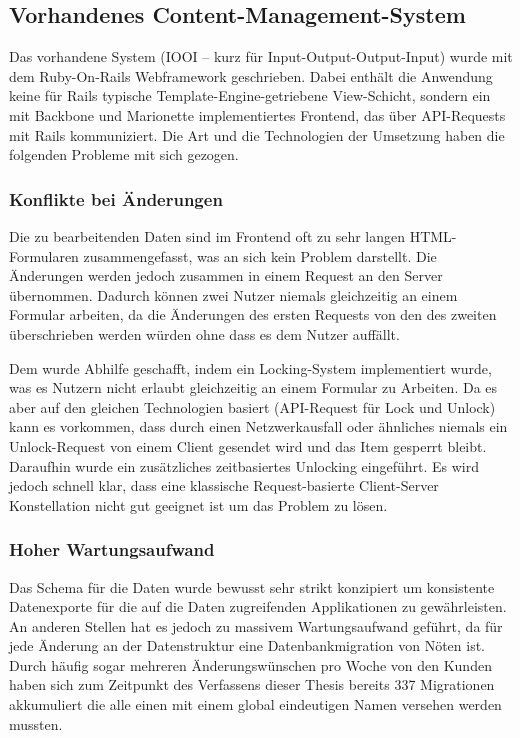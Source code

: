 \subsection{Vorhandenes Content-Management-System}
\label{ssec:ep-vorhandenes-content-management-system}

Das vorhandene System (IOOI -- kurz für Input-Output-Output-Input) wurde mit
dem Ruby-On-Rails Webframework geschrieben.  Dabei enthält die Anwendung keine
für Rails typische Template-Engine-getriebene View-Schicht, sondern ein mit
Backbone und Marionette \cite{marionette} implementiertes Frontend, das über
API-Requests mit Rails kommuniziert.  Die Art und die Technologien der Umsetzung
haben die folgenden Probleme mit sich gezogen.

\subsubsection{Konflikte bei Änderungen}
\label{sssec:epv-konflikte-bei-aenderungen}

Die zu bearbeitenden Daten sind im Frontend oft zu sehr langen HTML-Formularen
zusammengefasst, was an sich kein Problem darstellt.  Die Änderungen werden
jedoch zusammen in einem Request an den Server übernommen.  Dadurch können
zwei Nutzer niemals gleichzeitig an einem Formular arbeiten, da die Änderungen
des ersten Requests von den des zweiten überschrieben werden würden ohne dass
es dem Nutzer auffällt.

Dem wurde Abhilfe geschafft, indem ein Locking-System implementiert wurde, was
es Nutzern nicht erlaubt gleichzeitig an einem Formular zu Arbeiten.  Da es
aber auf den gleichen Technologien basiert (API-Request für Lock und Unlock)
kann es vorkommen, dass durch einen Netzwerkausfall oder ähnliches niemals ein
Unlock-Request von einem Client gesendet wird und das Item gesperrt bleibt.
Daraufhin wurde ein zusätzliches zeitbasiertes Unlocking eingeführt.  Es wird
jedoch schnell klar, dass eine klassische Request-basierte Client-Server
Konstellation nicht gut geeignet ist um das Problem zu lösen.

\subsubsection{Hoher Wartungsaufwand}
\label{sssec:epv-hoher-wartungsaufwand}

Das Schema für die Daten wurde bewusst sehr strikt konzipiert um konsistente
Datenexporte für die auf die Daten zugreifenden Applikationen zu gewährleisten.
An anderen Stellen hat es jedoch zu massivem Wartungsaufwand geführt, da für
jede Änderung an der Datenstruktur eine Datenbankmigration von Nöten ist.
Durch häufig sogar mehreren Änderungswünschen pro Woche von den Kunden haben
sich zum Zeitpunkt des Verfassens dieser Thesis bereits 337 Migrationen
akkumuliert die alle einen mit einem global eindeutigen Namen versehen werden
mussten.

